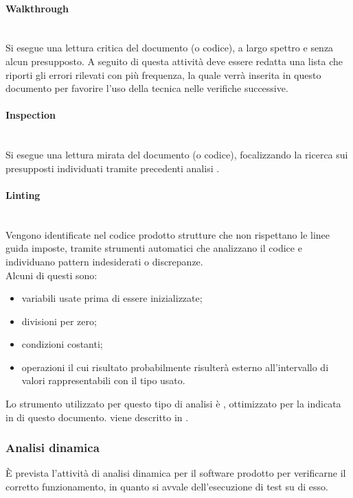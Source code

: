 \paragraph{Walkthrough} \mbox{}\\
Si esegue una lettura critica del documento (o codice), a largo spettro e senza alcun presupposto. A seguito di questa attività deve essere redatta una lista che riporti gli errori rilevati con più frequenza, la quale verrà inserita in questo documento per favorire l'uso della tecnica  nelle verifiche successive.

\paragraph{Inspection} \mbox{}\\
Si esegue una lettura mirata del documento (o codice), focalizzando la ricerca sui presupposti individuati tramite precedenti analisi .

\paragraph{Linting}\mbox{}\\
Vengono identificate nel codice prodotto strutture che non rispettano le linee guida imposte, tramite strumenti automatici che analizzano il codice e individuano pattern indesiderati o discrepanze.\\
Alcuni di questi sono:\begin{itemize}
	\item variabili usate prima di essere inizializzate;  
	\item divisioni per zero;
	\item condizioni costanti;
	\item operazioni il cui risultato probabilmente risulterà esterno all'intervallo di valori rappresentabili con il tipo usato.
\end{itemize}
Lo strumento utilizzato per questo tipo di analisi è , ottimizzato per la  indicata in  di questo documento.  viene descritto in .

\subsubsection{Analisi dinamica}
\`{E} prevista l’attività di analisi dinamica per il software prodotto per verificarne il corretto funzionamento, in quanto si avvale dell'esecuzione di test su di esso.
















